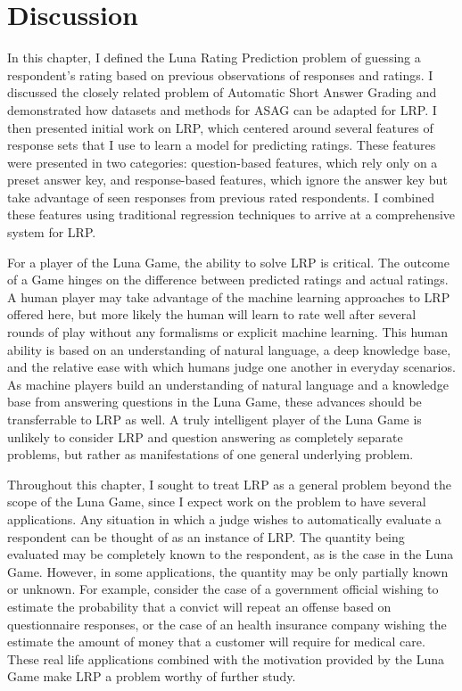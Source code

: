 \section{Discussion}
In this chapter, I defined the Luna Rating Prediction problem of guessing a respondent's rating based on previous observations of responses and ratings. I discussed the closely related problem of Automatic Short Answer Grading and demonstrated how datasets and methods for ASAG can be adapted for LRP. I then presented initial work on LRP, which centered around several features of response sets that I use to learn a model for predicting ratings. These features were presented in two categories: question-based features, which rely only on a preset answer key, and response-based features, which ignore the answer key but take advantage of seen responses from previous rated respondents. I combined these features using traditional regression techniques to arrive at a comprehensive system for LRP.

For a player of the Luna Game, the ability to solve LRP is critical. The outcome of a Game hinges on the difference between predicted ratings and actual ratings. A human player may take advantage of the machine learning approaches to LRP offered here, but more likely the human will learn to rate well after several rounds of play without any formalisms or explicit machine learning. This human ability is based on an understanding of natural language, a deep knowledge base, and the relative ease with which humans judge one another in everyday scenarios. As machine players build an understanding of natural language and a knowledge base from answering questions in the Luna Game, these advances should be transferrable to LRP as well. A truly intelligent player of the Luna Game is unlikely to consider LRP and question answering as completely separate problems, but rather as manifestations of one general underlying problem.

Throughout this chapter, I sought to treat LRP as a general problem beyond the scope of the Luna Game, since I expect work on the problem to have several applications. Any situation in which a judge wishes to automatically evaluate a respondent can be thought of as an instance of LRP. The quantity being evaluated may be completely known to the respondent, as is the case in the Luna Game. However, in some applications, the quantity may be only partially known or unknown. For example, consider the case of a government official wishing to estimate the probability that a convict will repeat an offense based on questionnaire responses, or the case of an health insurance company wishing the estimate the amount of money that a customer will require for medical care. These real life applications combined with the motivation provided by the Luna Game make LRP a problem worthy of further study.
